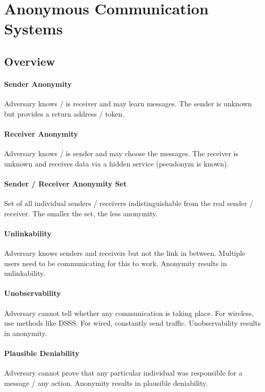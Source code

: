 \section{Anonymous Communication Systems}

\subsection{Overview}

\paragraph{Sender Anonymity}
Adversary knows / is receiver and may learn messages. The sender is unknown but provides a return address / token.

\paragraph{Receiver Anonymity}
Adversary knows / is sender and may choose the messages. The receiver is unknown and receives data via a hidden service (pseudonym is known).

\paragraph{Sender / Receiver Anonymity Set}
Set of all individual senders / receivers indistinguishable from the real sender / receiver. The smaller the set, the less anonymity.

\paragraph{Unlinkability}
Adversary knows senders and receivers but not the link in between. Multiple users need to be communicating for this to work. Anonymity results in unlinkability.

\paragraph{Unobservability}
Adversary cannot tell whether any communication is taking place. For wireless, use methods like DSSS. For wired, constantly send traffic. Unobservability results in anonymity.

\paragraph{Plausible Deniability}
Adversary cannot prove that any particular individual was responsible for a message / any action. Anonymity results in plausible deniability.

